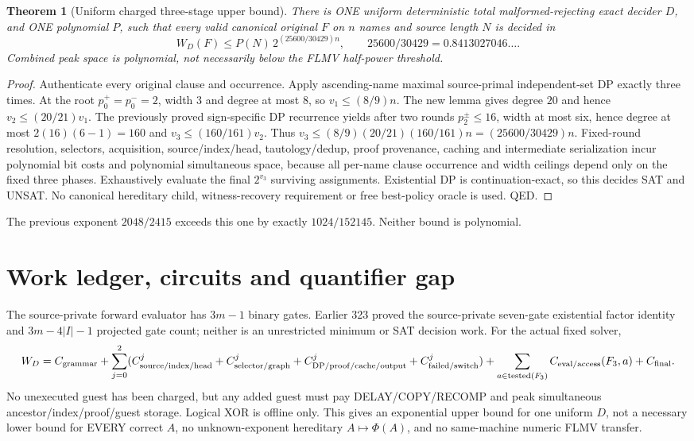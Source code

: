 \documentclass[11pt]{article}
\newtheorem{theorem}{Theorem}
\begin{document}
\begin{theorem}[Uniform charged three-stage upper bound]
There is ONE uniform deterministic total malformed-rejecting exact decider $D$, and ONE polynomial $P$, such that every valid canonical original $F$ on $n$ names and source length $N$ is decided in
\[
\boxed{W_D(F)\le P(N)\,2^{(25600/30429)n}},\qquad 25600/30429=0.8413027046\ldots.
\]
Combined peak space is polynomial, not necessarily below the FLMV half-power threshold.
\end{theorem}
\begin{proof}
Authenticate every original clause and occurrence. Apply ascending-name maximal source-primal independent-set DP exactly three times. At the root $p_0^+=p_0^-=2$, width $3$ and degree at most $8$, so $v_1\le(8/9)n$. The new lemma gives degree $20$ and hence $v_2\le(20/21)v_1$. The previously proved sign-specific DP recurrence yields after two rounds $p_2^\pm\le16$, width at most six, hence degree at most $2(16)(6-1)=160$ and $v_3\le(160/161)v_2$. Thus $v_3\le(8/9)(20/21)(160/161)n=(25600/30429)n$. Fixed-round resolution, selectors, acquisition, source/index/head, tautology/dedup, proof provenance, caching and intermediate serialization incur polynomial bit costs and polynomial simultaneous space, because all per-name clause occurrence and width ceilings depend only on the fixed three phases. Exhaustively evaluate the final $2^{v_3}$ surviving assignments. Existential DP is continuation-exact, so this decides SAT and UNSAT. No canonical hereditary child, witness-recovery requirement or free best-policy oracle is used. QED.
\end{proof}
The previous exponent $2048/2415$ exceeds this one by exactly $1024/152145$. Neither bound is polynomial.
\section{Work ledger, circuits and quantifier gap}
The source-private forward evaluator has $3m-1$ binary gates. Earlier 323 proved the source-private seven-gate existential factor identity and $3m-4|I|-1$ projected gate count; neither is an unrestricted minimum or SAT decision work. For the actual fixed solver,
\[
W_D=C_{\rm grammar}+\sum_{j=0}^2(C_{\rm source/index/head}^{j}+C_{\rm selector/graph}^{j}
+C_{\rm DP/proof/cache/output}^{j}+C_{\rm failed/switch}^{j})
+\sum_{a\in{\rm tested}(F_3)}C_{\rm eval/access}(F_3,a)+C_{\rm final}.
\]
No unexecuted guest has been charged, but any added guest must pay DELAY/COPY/RECOMP and peak simultaneous ancestor/index/proof/guest storage. Logical XOR is offline only. This gives an exponential upper bound for one uniform $D$, not a necessary lower bound for EVERY correct $A$, no unknown-exponent hereditary $A\mapsto\Phi(A)$, and no same-machine numeric FLMV transfer.
\end{document}
